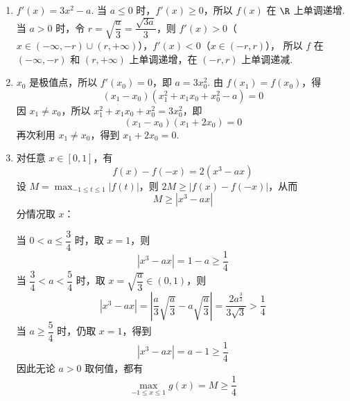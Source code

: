 \begin{solution}
\begin{enumerate}
\item \(f'(x)=3x^2-a\). 当 \(a\leqslant0\) 时，\(f'(x)\geqslant0\)，所以
\(f(x)\) 在 \(\R\) 上单调递增. 当 \(a>0\) 时，令
\(r=\sqrt{\dfrac a3}=\dfrac{\sqrt{3a}}3\)，则
\(f'(x)>0\)（\(x\in(-\infty,-r)\cup(r,+\infty)\)），\(f'(x)<0\)（\(x\in(-r,r)\)），
所以 \(f\) 在 \((-\infty,-r)\) 和 \((r,+\infty)\) 上单调递增，在
\((-r,r)\) 上单调递减.

\item \(x_0\) 是极值点，所以 \(f'(x_0)=0\)，即
\(a=3x_0^2\). 由 \(f(x_1)=f(x_0)\)，得
\[
(x_1-x_0)(x_1^2+x_1x_0+x_0^2-a)=0
\]
因 \(x_1\ne x_0\)，所以
\(x_1^2+x_1x_0+x_0^2=3x_0^2\)，即
\[
(x_1-x_0)(x_1+2x_0)=0
\]
再次利用 \(x_1\ne x_0\)，得到 \(x_1+2x_0=0\).

\item 对任意 \(x\in[0,1]\)，有
\[
f(x)-f(-x)=2(x^3-ax)
\]
设 \(M=\max_{-1\leqslant t\leqslant1}|f(t)|\)，则
\(2M\geqslant|f(x)-f(-x)|\)，从而
\[
M\geqslant|x^3-ax|
\]
分情况取 \(x\)：

当 \(0<a\leqslant\dfrac34\) 时，取 \(x=1\)，则
\[
|x^3-ax|=1-a\geqslant\dfrac14
\]
当 \(\dfrac34<a<\dfrac54\) 时，取
\(x=\sqrt{\dfrac a3}\in(0,1)\)，则
\[
|x^3-ax|
=\left|\dfrac a3\sqrt{\dfrac a3}-a\sqrt{\dfrac a3}\right|
=\dfrac{2a^{\frac{3}{2}}}{3\sqrt3}
>\dfrac14
\]
当 \(a\geqslant\dfrac54\) 时，仍取 \(x=1\)，得到
\[
|x^3-ax|=a-1\geqslant\dfrac14
\]
因此无论 \(a>0\) 取何值，都有
\[
\max_{-1\leqslant x\leqslant1}g(x)=M\geqslant\dfrac14
\]
\end{enumerate}
\end{solution}
